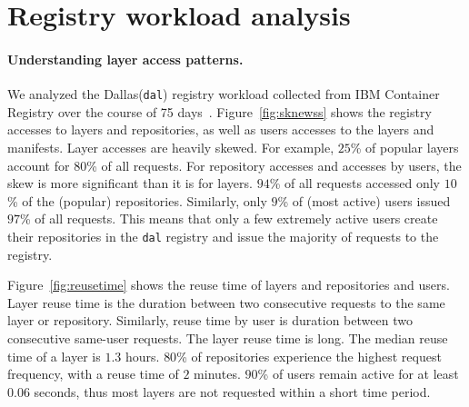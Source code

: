 
\section{Registry workload analysis}


\paragraph{Understanding layer access patterns.}
We analyzed the Dallas(\texttt{dal}) registry workload collected from IBM Container Registry over the course of 75 days~\cite{dockerworkload}. 
Figure~\ref{fig:sknewss} shows the registry accesses to layers and repositories, as well as users accesses to the layers and manifests.
Layer accesses are heavily skewed. For example, $25$\% of popular layers account for $80$\% of all requests. 
For repository accesses and accesses by users, the skew is more significant than it is for layers. %
$94$\% of all requests accessed only $10$\% of the (popular) repositories. Similarly, only $9$\% of (most active) users issued $97$\% of all requests. 
This means that only a few extremely active users create their repositories in the \texttt{dal} registry and issue the majority of requests to the registry.

Figure~\ref{fig:reusetime} shows the reuse time of layers and repositories and users.
Layer reuse time is the duration between two consecutive requests to the same layer or repository. Similarly,
reuse time by user is duration between two consecutive same-user requests.
The layer reuse time is long.
The median reuse time of a layer is $1.3$ hours. $80$\% of repositories experience the highest request frequency, with a reuse time of $2$ minutes. 
$90$\% of users remain active for at least $0.06$ seconds, thus most layers are not requested within a short time period.

